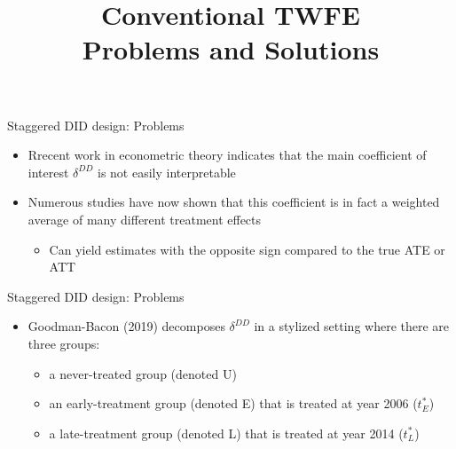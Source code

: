 \documentclass[dvipsnames,hyperref={pdfpagelabels=false}]{beamer}
\begin{document}
\title[]  
{Conventional TWFE  \\  Problems and Solutions}


\author 
{}

\institute{}






\date
{}


\begin{frame}{}
	\titlepage
\end{frame}

\begin{frame}{Staggered DID design: Problems}{}
	\begin{itemize}
	
					\vspace{0.2cm}
		\item Rrecent work in econometric theory indicates that the main coefficient of interest $\delta^{DD}$ is
		not easily interpretable
							\vspace{0.2cm}
		\item Numerous studies have now shown that this coefficient is in fact a weighted average of
		many different treatment effects
		\vspace{0.2cm}
		\begin{itemize}
			\item Can yield estimates with the opposite sign compared to the
			true ATE or ATT
		\end{itemize}
		
	\end{itemize}
\end{frame}





\begin{frame}{Staggered DID design: Problems}{}
	\begin{itemize}
		\item Goodman-Bacon (2019) decomposes $\delta^{DD}$  in a stylized setting where there are  three groups:
		\vspace{0.2cm}
		\begin{itemize}
			\item[1] a never-treated group (denoted U)
					\vspace{0.2cm}
			\item[2] an early-treatment group (denoted E) that is
			treated at year 2006 ($t^{*}_{E}$)
			\vspace{0.2cm}
			\item[3] a late-treatment group (denoted L) that is treated at year 2014 ($t^{*}_{L}$)
		\end{itemize}
		
		
	\end{itemize}
\end{frame}
\end{document}
